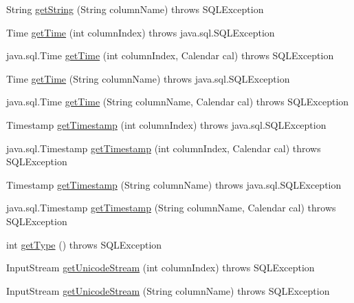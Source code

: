 \begin{DoxyCompactItemize}
\item 
String \mbox{\hyperlink{classcom_1_1mysql_1_1jdbc_1_1_result_set_impl_ac3392db13c1e1bd57aa8e641ea282fcf}{get\+String}} (String column\+Name)  throws S\+Q\+L\+Exception 
\item 
Time \mbox{\hyperlink{classcom_1_1mysql_1_1jdbc_1_1_result_set_impl_a8eba20925d3ad454aba811f47ac4de65}{get\+Time}} (int column\+Index)  throws java.\+sql.\+S\+Q\+L\+Exception 
\item 
java.\+sql.\+Time \mbox{\hyperlink{classcom_1_1mysql_1_1jdbc_1_1_result_set_impl_a36995a9baa7703f1ff95ef398736a7c1}{get\+Time}} (int column\+Index, Calendar cal)  throws S\+Q\+L\+Exception 
\item 
Time \mbox{\hyperlink{classcom_1_1mysql_1_1jdbc_1_1_result_set_impl_a1ef88fb26be60b7e950e8f34426d3a55}{get\+Time}} (String column\+Name)  throws java.\+sql.\+S\+Q\+L\+Exception 
\item 
java.\+sql.\+Time \mbox{\hyperlink{classcom_1_1mysql_1_1jdbc_1_1_result_set_impl_a5014fd4ae2a0df1e39cb403441473e9b}{get\+Time}} (String column\+Name, Calendar cal)  throws S\+Q\+L\+Exception 
\item 
Timestamp \mbox{\hyperlink{classcom_1_1mysql_1_1jdbc_1_1_result_set_impl_a2d88cacb474130b5646e9cd9fc043718}{get\+Timestamp}} (int column\+Index)  throws java.\+sql.\+S\+Q\+L\+Exception 
\item 
java.\+sql.\+Timestamp \mbox{\hyperlink{classcom_1_1mysql_1_1jdbc_1_1_result_set_impl_ad4a93118a534cdfa3432fa71de34ffa6}{get\+Timestamp}} (int column\+Index, Calendar cal)  throws S\+Q\+L\+Exception 
\item 
Timestamp \mbox{\hyperlink{classcom_1_1mysql_1_1jdbc_1_1_result_set_impl_ab59180f7dee8a2c4f89a30d6d9140e3e}{get\+Timestamp}} (String column\+Name)  throws java.\+sql.\+S\+Q\+L\+Exception 
\item 
java.\+sql.\+Timestamp \mbox{\hyperlink{classcom_1_1mysql_1_1jdbc_1_1_result_set_impl_aea1f8033f50dc70c022687e65fe1b570}{get\+Timestamp}} (String column\+Name, Calendar cal)  throws S\+Q\+L\+Exception 
\item 
int \mbox{\hyperlink{classcom_1_1mysql_1_1jdbc_1_1_result_set_impl_a66b98332ec7fdf8c908bb4118d6097d1}{get\+Type}} ()  throws S\+Q\+L\+Exception 
\item 
Input\+Stream \mbox{\hyperlink{classcom_1_1mysql_1_1jdbc_1_1_result_set_impl_ae1fb89a978f6a70882bb7305f8266234}{get\+Unicode\+Stream}} (int column\+Index)  throws S\+Q\+L\+Exception 
\item 
Input\+Stream \mbox{\hyperlink{classcom_1_1mysql_1_1jdbc_1_1_result_set_impl_ac6f678af8cdf491781c04615014e58f5}{get\+Unicode\+Stream}} (String column\+Name)  throws S\+Q\+L\+Exception 

\end{DoxyCompactItemize}
